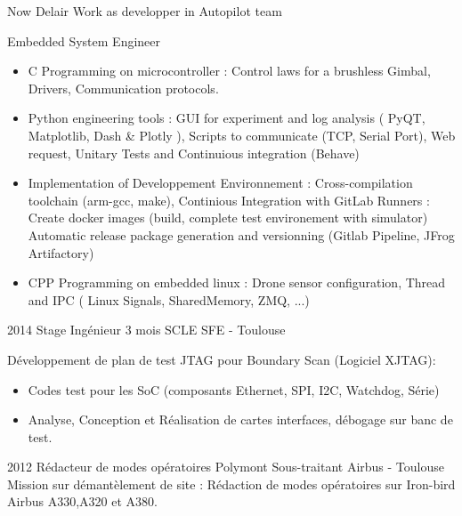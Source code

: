 \documentclass[a4paper]{friggeri-cv} %
\begin{document}
\begin{entrylist}
\entry
{Now}
{Delair}
{Work as developper in Autopilot team}
{Embedded System Engineer
\begin{itemize}
\item C Programming on microcontroller : Control laws for a brushless Gimbal, Drivers, Communication protocols.
\item Python engineering tools : GUI for experiment and log analysis ( PyQT, Matplotlib, Dash \& Plotly ), Scripts to communicate (TCP, Serial Port), Web request, Unitary Tests and Continuious integration (Behave)
\item Implementation of Developpement Environnement : Cross-compilation toolchain (arm-gcc, make), Continious Integration with GitLab Runners : Create docker images (build, complete test environement with simulator) Automatic release package generation and versionning (Gitlab Pipeline, JFrog Artifactory)
\item CPP Programming on embedded linux : Drone sensor configuration, Thread and IPC (  Linux Signals, SharedMemory, ZMQ, ...)
\end{itemize}
%
}
\entry
{2014}
{Stage Ingénieur 3 mois}
{SCLE SFE - Toulouse}
{Développement de plan de test JTAG pour Boundary Scan (Logiciel XJTAG):\smallskip
\begin{itemize}
\item Codes test pour les SoC (composants Ethernet, SPI, I2C, Watchdog, Série)
\item Analyse, Conception et Réalisation de cartes interfaces, débogage sur banc de test.
\end{itemize}}


\entry
{2012}
{Rédacteur de modes opératoires}
{Polymont Sous-traitant Airbus - Toulouse}
{Mission sur démantèlement de site : Rédaction de modes opératoires sur Iron-bird Airbus A330,A320 et A380.}




\end{entrylist}


\end{document}
